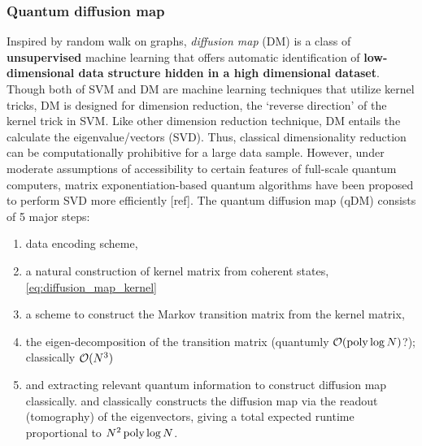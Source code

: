 \subsubsection{Quantum diffusion map}
Inspired by random walk on graphs, \emph{diffusion map} (DM) \cite{sornsaengQuantumDiffusionMap2021} is a class of \textbf{unsupervised} machine learning that offers automatic identification of \textbf{low-dimensional data structure hidden in a high dimensional dataset}.
Though both of SVM and DM are machine learning techniques that utilize kernel tricks, DM is designed for dimension reduction, the `reverse direction' of the kernel trick in SVM.
Like other dimension reduction technique, DM entails the calculate the eigenvalue/vectors (SVD).
Thus, classical dimensionality reduction can be computationally prohibitive for a large data sample. 
However, under moderate assumptions of accessibility to certain features of full-scale quantum computers, matrix exponentiation-based quantum algorithms have been proposed to perform SVD more efficiently [ref]. 
The quantum diffusion map (qDM) consists of 5 major steps: 
\begin{enumerate}
	\item {} data encoding scheme, 
	\item 
	a natural construction of kernel matrix from coherent states, 
	\cref{eq:diffusion_map_kernel}
	\item 
	a scheme to construct the Markov transition matrix from the kernel matrix, 
	\item 
	the eigen-decomposition of the transition matrix (quantumly $\mathcal{O}(\operatorname{\textup{poly}}\log N)$?); classically $\mathcal{O}(N^3)$
	\item 
	and extracting relevant quantum information to construct diffusion map classically. 
	and classically constructs the diffusion map via the readout (tomography) of the eigenvectors, giving a total expected runtime proportional to $N^2 \operatorname{\textup{poly}}\log N$.
\end{enumerate}
